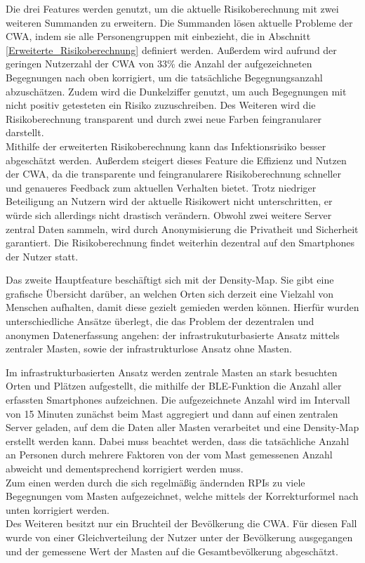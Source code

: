 \documentclass[conference,compsoc]{IEEEtran}
\begin{document}
Die drei Features werden genutzt, um die aktuelle Risikoberechnung mit zwei weiteren Summanden zu erweitern.
Die Summanden lösen aktuelle Probleme der CWA, indem sie alle Personengruppen mit einbezieht, die in Abschnitt \ref{Erweiterte_Risikoberechnung} definiert werden.
Außerdem wird aufrund der geringen Nutzerzahl der CWA von 33\% die Anzahl der aufgezeichneten Begegnungen nach oben korrigiert, um die tatsächliche Begegnungsanzahl abzuschätzen. 
Zudem wird die Dunkelziffer genutzt, um auch Begegnungen mit nicht positiv getesteten ein Risiko zuzuschreiben.
Des Weiteren wird die Risikoberechnung transparent und durch zwei neue Farben feingranularer darstellt.\\
Mithilfe der erweiterten Risikoberechnung kann das Infektionsrisiko besser abgeschätzt werden.
Außerdem steigert dieses Feature die Effizienz und Nutzen der CWA, da die transparente und feingranularere Risikoberechnung schneller und genaueres Feedback zum aktuellen Verhalten bietet. 
Trotz niedriger Beteiligung an Nutzern wird der aktuelle Risikowert nicht unterschritten, er würde sich allerdings nicht drastisch verändern.
Obwohl zwei weitere Server zentral Daten sammeln, wird durch Anonymisierung die Privatheit und Sicherheit garantiert.
Die Risikoberechnung findet weiterhin dezentral auf den Smartphones der Nutzer statt. 

Das zweite Hauptfeature beschäftigt sich mit der Density-Map. 
Sie gibt eine grafische Übersicht darüber, an welchen Orten sich derzeit eine Vielzahl von Menschen aufhalten, damit diese gezielt gemieden werden können. 
Hierfür wurden unterschiedliche Ansätze überlegt, die das Problem der dezentralen und anonymen Datenerfassung angehen: 
der infrastrukuturbasierte Ansatz mittels zentraler Masten, sowie der infrastrukturlose Ansatz ohne Masten. 

Im infrastrukturbasierten Ansatz werden zentrale Masten an stark besuchten Orten und Plätzen aufgestellt, die mithilfe der BLE-Funktion die Anzahl aller erfassten Smartphones aufzeichnen.
Die aufgezeichnete Anzahl wird im Intervall von 15 Minuten zunächst beim Mast aggregiert und dann auf einen zentralen Server geladen, auf dem die Daten aller Masten verarbeitet und eine Density-Map erstellt werden kann.
Dabei muss beachtet werden, dass die tatsächliche Anzahl an Personen durch mehrere Faktoren von der vom Mast gemessenen Anzahl abweicht und dementsprechend korrigiert werden muss.\\
Zum einen werden durch die sich regelmäßig ändernden RPIs zu viele Begegnungen vom Masten aufgezeichnet, welche mittels der Korrekturformel nach unten korrigiert werden.\\
Des Weiteren besitzt nur ein Bruchteil der Bevölkerung die CWA. Für diesen Fall wurde von einer Gleichverteilung der Nutzer unter der Bevölkerung ausgegangen und der gemessene Wert der Masten auf die Gesamtbevölkerung abgeschätzt.
\end{document}
